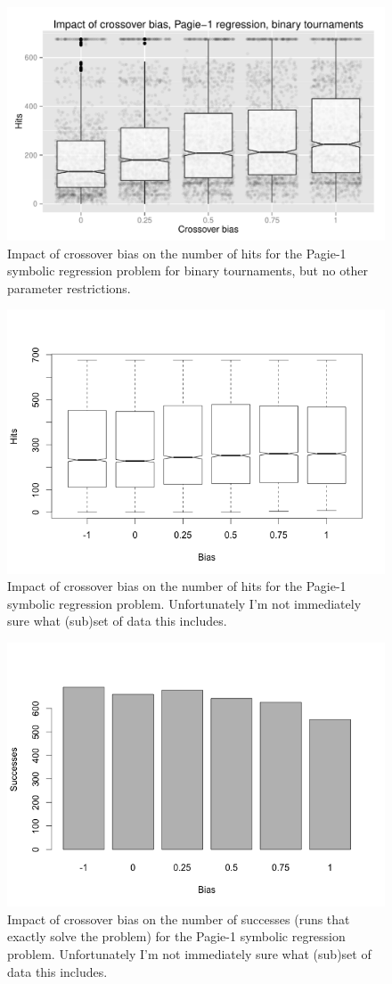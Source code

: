 \documentclass{sig-alternate}
\begin{document}
\begin{figure}
\centering
\includegraphics[width=0.45 \textwidth]{Plots/Pagie_1_Hits_binary_tournaments.pdf}
\caption{Impact of crossover bias on the number of hits for the Pagie-1 symbolic regression problem for binary 
tournaments, but no other parameter restrictions.}
\label{fig:Pagie1Hits_Binary_tournaments}
\end{figure}


\begin{figure}
\centering
\includegraphics[width=0.45 \textwidth]{Plots/Pagie-1_Hits_vs_Bias.png}
\caption{Impact of crossover bias on the number of hits for the Pagie-1 symbolic regression problem. 
Unfortunately I'm not immediately sure what (sub)set of data this includes.}
\label{fig:Pagie1Hits}
\end{figure}

\begin{figure}
\centering
\includegraphics[width=0.45 \textwidth]{Plots/Pagie-1_Successes_vs_Bias.png}
\caption{Impact of crossover bias on the number of successes (runs that exactly solve the problem) for the 
Pagie-1 symbolic regression problem. Unfortunately I'm not immediately sure what (sub)set of data this 
includes.}
\label{fig:Pagie1Successes}
\end{figure}
\end{document}
